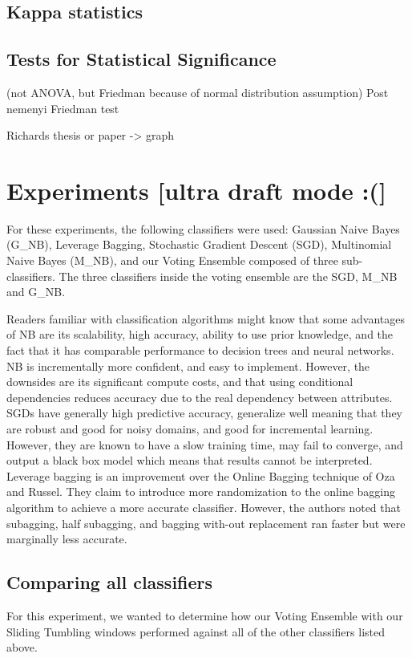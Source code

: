 \subsection{Kappa statistics}


\subsection{Tests for Statistical Significance}
(not ANOVA, but Friedman because of normal distribution assumption)
Post nemenyi
Friedman test

Richards thesis or paper -> graph

\section{Experiments [ultra draft mode :(]}
For these experiments, the following classifiers were used: Gaussian Naive Bayes (G\_NB), Leverage Bagging, Stochastic Gradient Descent (SGD), Multinomial Naive Bayes (M\_NB), and our Voting Ensemble composed of three sub-classifiers. The three classifiers inside the voting ensemble are the SGD, M\_NB and G\_NB.

Readers familiar with classification algorithms might know that some advantages of NB are its scalability, high accuracy, ability to use prior knowledge, and the fact that it has comparable performance to decision trees and neural networks. NB is incrementally more confident, and easy to implement. However, the downsides are its significant compute costs, and that using conditional dependencies reduces accuracy due to the real dependency between attributes.
SGDs have generally high predictive accuracy, generalize well meaning that they are robust and good for noisy domains, and good for incremental learning. However, they are known to have a slow training time, may fail to converge, and output a black box model which means that results cannot be interpreted.
Leverage bagging \cite{bifet2010leveraging} is an improvement over the Online Bagging technique of Oza and Russel. They claim to introduce more randomization to the online bagging algorithm to achieve a more accurate classifier. However, the authors noted that subagging, half subagging, and bagging with-out replacement ran faster but were marginally less accurate.

\subsection{Comparing all classifiers}
For this experiment, we wanted to determine how our Voting Ensemble with our Sliding Tumbling windows performed against all of the other classifiers listed above.

